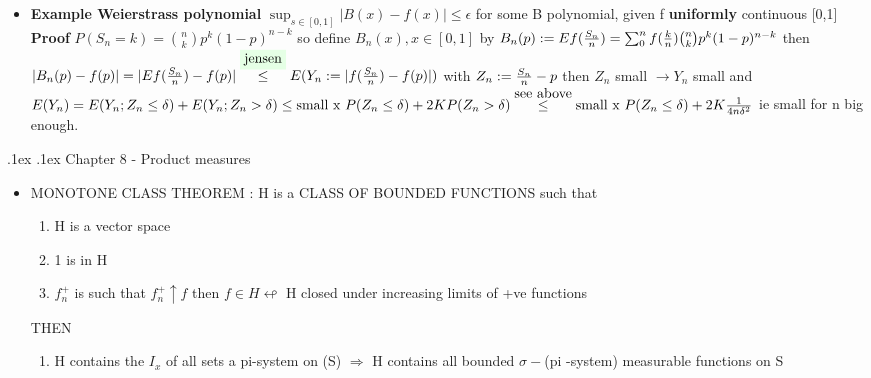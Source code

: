 \documentclass[10pt,landscape,a4paper]{article}
\makeatletter
\renewcommand{\section}{\@startsection{section}{1}{0mm}%
                                {.1ex}%
                                {.1ex}%
                                {\color{blue}\sffamily\small\bfseries}}
\newcommand\myle[1]{\stackrel{{\normalfont\mbox{#1}}}{ \le }}
\makeatother
\begin{document}
\begin{multicols*}{3}
\begin{spacing}{0.5}
\begin{itemize}
\item \textbf{Example Weierstrass polynomial} \colorbox{green!10}{$\sup_{s \in [0,1]} |B(x)-f(x)| \le \epsilon$} for some B polynomial, given f \textbf{uniformly} continuous [0,1] \textbf{Proof} $P(S_n=k)=\binom{n}{k}p^k (1-p)^{n-k}$ so define $B_n(x), x\in [0,1]$  by $B_n(p) := Ef( {S_n\over n})=\sum_0^n f({k \over n}) \binom{n}{k}p^k (1-p)^{n-k} $ then $|B_n(p)-f(p)|=|E{f({S_n \over n})-f(p)}| \myle{\colorbox{green!10}{jensen}} E(Y_n := |f({S_n \over n})-f(p)|)$ with $Z_n := {S_n \over n} -p$ then $Z_n$ small $\rightarrow Y_n$ small and $E(Y_n)= E(Y_n;Z_n \le \delta) + E(Y_n;Z_n > \delta) \le \text{small x }P(Z_n \le \delta) + 2K P(Z_n > \delta) \myle {see above} \text{small x }P(Z_n \le \delta) + 2K {1 \over {4n\delta^2}} $ ie small for n big enough.

\end{itemize}

\section{Chapter 8 - Product measures}

\begin{itemize}
\item MONOTONE CLASS THEOREM : H is a CLASS OF BOUNDED FUNCTIONS such that
\begin{enumerate}
\item H is a vector space
\item 1 is in H
\item $f_n^+$ is such that $f_n^+ \uparrow f$ then $f \in H \looparrowleft$ H closed under increasing limits of +ve  functions
\end{enumerate}
THEN
\begin{enumerate}[resume]
\item H contains the $I_x$ of all sets a pi-system on (S)  $\Rightarrow$ H contains all bounded  $\sigma-$(pi -system) measurable functions on S
\end{enumerate}


\end{itemize}


\end{spacing}
\end{multicols*}
\end{document}
